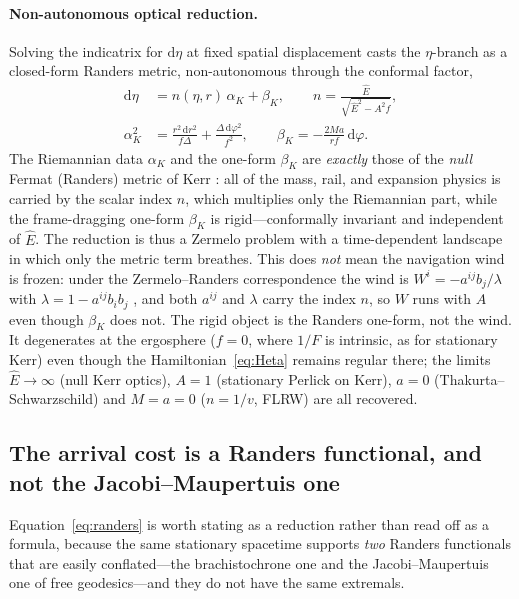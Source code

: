 \documentclass[12pt]{iopart}
\theoremstyle{plain}
\theoremstyle{definition}
\theoremstyle{remark}
\newcommand{\Ehat}{\hat E}
\newcommand{\dd}{\mathrm{d}}
\begin{document}
\paragraph{Non-autonomous optical reduction.} Solving the indicatrix for
$\dd\eta$ at fixed spatial displacement casts the $\eta$-branch as a closed-form
Randers metric, non-autonomous through the conformal factor,
\begin{align}
    \dd\eta &= n(\eta,r)\,\alpha_K+\beta_K,\qquad
    n=\frac{\Ehat}{\sqrt{\Ehat^2-A^2 f}},
    \label{eq:randers}\\
    \alpha_K^2 &= \frac{r^2\,\dd r^2}{f\Delta}+\frac{\Delta\,\dd\varphi^2}{f^2},
    \qquad
    \beta_K = -\frac{2Ma}{rf}\,\dd\varphi.
    \label{eq:randers-data}
\end{align}
The Riemannian data $\alpha_K$ and the one-form $\beta_K$ are \emph{exactly} those
of the \emph{null} Fermat (Randers) metric of Kerr \cite{GibbonsWerner2008}: all
of the mass, rail, and expansion physics is carried by the scalar index $n$,
which multiplies only the Riemannian part, while the frame-dragging one-form
$\beta_K$ is rigid---conformally invariant and independent of $\Ehat$. The
reduction is thus a Zermelo problem with a time-dependent landscape in which only
the metric term breathes. This does \emph{not} mean the navigation wind is frozen:
under the Zermelo--Randers correspondence the wind is
$W^i=-a^{ij}b_j/\lambda$ with $\lambda=1-a^{ij}b_ib_j$ \cite{BaoRoblesShen}, and
both $a^{ij}$ and $\lambda$ carry the index $n$, so $W$ runs with $A$ even though
$\beta_K$ does not. The rigid object is the Randers one-form, not the wind. It degenerates at the ergosphere ($f=0$,
where $1/F$ is intrinsic, as for stationary Kerr) even though the
Hamiltonian~\eqref{eq:Heta} remains regular there; the limits $\Ehat\to\infty$
(null Kerr optics), $A=1$ (stationary Perlick on Kerr), $a=0$
(Thakurta--Schwarzschild) and $M=a=0$ ($n=1/v$, FLRW) are all recovered.

\subsection{The arrival cost is a Randers functional, and not the
Jacobi--Maupertuis one}
\label{sec:randers-reduction}
Equation~\eqref{eq:randers} is worth stating as a reduction rather than read off
as a formula, because the same stationary spacetime supports \emph{two} Randers
functionals that are easily conflated---the brachistochrone one and the
Jacobi--Maupertuis one of free geodesics---and they do not have the same
extremals.
\end{document}
